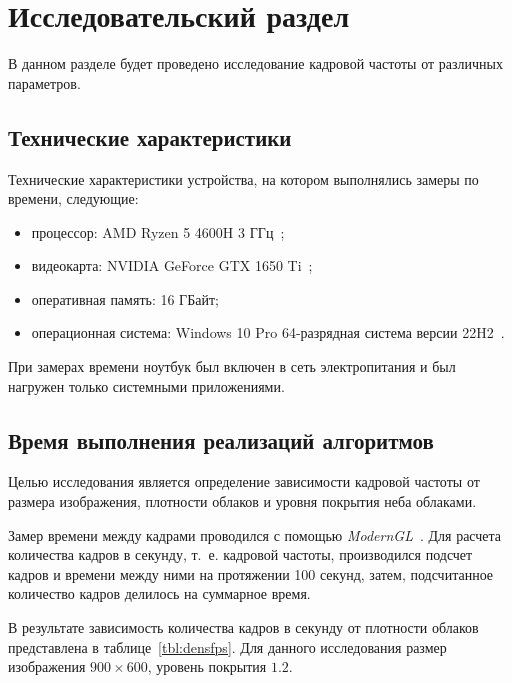 \chapter{Исследовательский раздел}

В данном разделе будет проведено исследование кадровой частоты от различных параметров.

\section{Технические характеристики}

Технические характеристики устройства, на котором выполнялись замеры по времени, следующие:
\begin{itemize}
	\item процессор: AMD Ryzen 5 4600H 3 ГГц~\cite{amd};
	\item видеокарта: NVIDIA GeForce GTX 1650 Ti~\cite{nvidia};
	\item оперативная память: 16 ГБайт;
	\item операционная система: Windows 10 Pro 64-разрядная система версии 22H2~\cite{windows}.
\end{itemize}

При замерах времени ноутбук был включен в сеть электропитания и был нагружен только системными приложениями.

\section{Время выполнения реализаций алгоритмов}

Целью исследования является определение зависимости кадровой частоты от размера изображения, плотности облаков и уровня покрытия неба облаками.

Замер времени между кадрами проводился с помощью \textit{ModernGL}~\cite{moderngl}. Для расчета количества кадров в секунду, т.~е. кадровой частоты, производился подсчет кадров и времени между ними на протяжении 100 секунд, затем, подсчитанное количество кадров делилось на суммарное время.

В результате зависимость количества кадров в секунду от плотности облаков представлена в таблице~\ref{tbl:densfps}. Для данного исследования размер изображения $900 \times 600$, уровень покрытия $1.2$.

